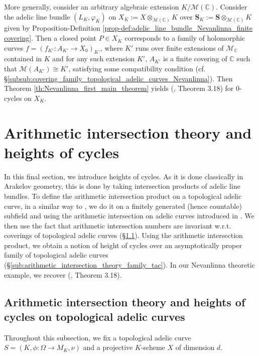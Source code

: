 \documentclass [11pt,reqno]{amsart}
\def\bC{{\mathbb{C}}}
\newcommand{\1}{\mathmybb{1}}
\def\cM{{\mathcal{M}}}
\begin{document}
\begin{example}
More generally, consider an arbitrary algebraic extension $K/\cM(\bC)$. Consider the adelic line bundle $(L_{K},\varphi_{K})$ on $X_{K}:=X\otimes_{\cM(\bC)}K$ over $\mathbf{S}_{K}:=\mathbf{S}\otimes_{\cM(\bC)}K$ given by Proposition-Definition \ref{prop-def:adelic_line_bundle_Nevanlinna_finite covering}. Then a closed point $P\in X_{K}$ corresponds to a family of holomorphic curves $f=(f_{K'}:A_{K'}\to X_{0})_{K'}$, where $K'$ runs over finite extensions of $\cM_{\bC}$ contained in $K$ and for any such extension $K'$, $A_{K'}$ is a finite covering of $\bC$ such that $\cM(A_{K'})\cong K'$, satisfying some compatibility condition (cf. \S \ref{subsub:covering_family_topological_adelic_curves_Nevanlinna}). Then Theorem \ref{th:Nevanlinna_first_main_theorem} yields (\cite{Gubler97}, Theorem 3.18) for $0$-cycles on $X_{K}$. 
\end{example}

\section{Arithmetic intersection theory and heights of cycles}
\label{sec:arithmetic_intersection_product}

In this final section, we introduce heights of cycles. As it is done classically in Arakelov geometry, this is done by taking intersection products of adelic line bundles. To define the arithmetic intersection product on a topological adelic curve, in a similar way to \cite{Gubler97}, we do it on a finitely generated (hence countable) subfield and using the arithmetic intersection on adelic curves introduced in \cite{ChenMori21}. We then use the fact that arithmetic intersection numbers are invariant w.r.t. coverings of topological adelic curves (\S \ref{sub:arithmetic_intersection_theory_tac}). Using the arithmetic intersection product, we obtain a notion of height of cycles over an asymptotically proper family of topological adelic curves (\S \ref{sub:arithmetic_intersection_theory_family_tac}). In our Nevanlinna theoretic example, we recover (\cite{Gubler97}, Theorem 3.18).

\subsection{Arithmetic intersection theory and heights of cycles on topological adelic curves}
\label{sub:arithmetic_intersection_theory_tac}

Throughout this subsection, we fix a topological adelic curve $S=(K,\phi:\Omega\to M_{K},\nu)$ and a projective $K$-scheme $X$ of dimension $d$. 
\end{document}
